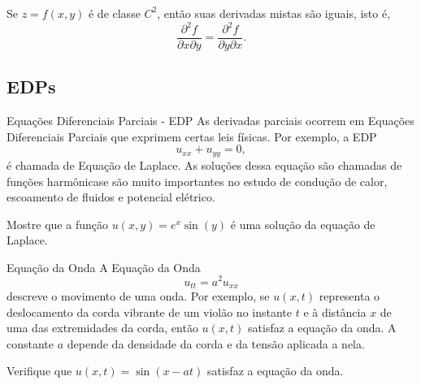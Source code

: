 \begin{frame}[label=der-parciais]
	\frametitle{ }
	
\begin{teo} Se $z=f(x,y)$ é de classe $C^2$, então suas derivadas mistas são iguais, isto é, 
				$$\frac{\partial^2 f}{\partial x\partial y}=\frac{\partial^2 f}{\partial y\partial x}.$$
			\end{teo} 
			
		
\end{frame}

\subsection*{EDPs}
\begin{frame}[label=der-parciais]{Equações Diferenciais Parciais - EDP}
As derivadas parciais ocorrem em {\color{blue}Equações Diferenciais Parciais} que exprimem certas leis físicas. Por exemplo, a EDP
\[u_{xx}+u_{yy}=0,\]
é chamada de {\color{blue} Equação de Laplace}. As soluções dessa equação são chamadas de {\color{blue} funções harmônicas}e são muito importantes no estudo de condução de calor, escoamento de fluidos e potencial elétrico.

\begin{exe}
Mostre que a função $u(x,y)=e^x\sin(y)$ é uma solução da equação de Laplace.
\end{exe}
\end{frame}

\begin{frame}[label=der-parciais]{Equação da Onda}
A {\color{blue}Equação da Onda}
\[u_{tt}=a^2u_{xx}\]
descreve o movimento de uma onda. Por exemplo, se $u(x,t)$ representa o deslocamento da corda vibrante de um violão no instante $t$ e à distância $x$ de uma das extremidades da corda, então $u(x,t)$ satisfaz a equação da onda. A constante $a$ depende da densidade da corda  e da tensão aplicada a nela.

\begin{exe}
Verifique que $u(x,t)=\sin(x-at)$ satisfaz a equação da onda.
\end{exe}
\end{frame}



